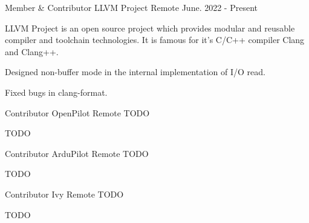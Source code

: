 

\begin{cventries}

  \cventry
    {Member \& Contributor} %
    {LLVM Project} %
    {Remote} %
    {June. 2022 - Present} %
    {
      \begin{cvitems} %
        \item {LLVM Project is an open source project which provides modular and reusable compiler and toolchain technologies. It is famous for it's C/C++ compiler Clang and Clang++.}
        \item {Designed non-buffer mode in the internal implementation of I/O read.}
        \item {Fixed bugs in clang-format.}
      \end{cvitems}
    }

  \cventry
    {Contributor} %
    {OpenPilot} %
    {Remote} %
    {TODO} %
    {
      \begin{cvitems} %
        \item {TODO}
      \end{cvitems}
    }

  \cventry
    {Contributor} %
    {ArduPilot} %
    {Remote} %
    {TODO} %
    {
      \begin{cvitems} %
        \item {TODO}
      \end{cvitems}
    }

  \cventry
    {Contributor} %
    {Ivy} %
    {Remote} %
    {TODO} %
    {
      \begin{cvitems} %
        \item {TODO}
      \end{cvitems}
    }

\end{cventries}
